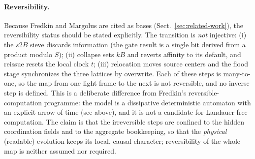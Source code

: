 \documentclass{ijuc}
\begin{document}
\paragraph{Reversibility.} Because Fredkin and Margolus are cited as bases (Sect.~\ref{sec:related-work}), the reversibility status should be stated explicitly.  The transition is \emph{not} injective: (i) the $s2B$ sieve discards information (the gate result is a single bit derived from a product modulo $S$); (ii) collapse sets $kB$ and reverts affinity to its default, and reissue resets the local clock $t$; (iii) relocation moves source centers and the flood stage synchronizes the three lattices by overwrite.  Each of these steps is many-to-one, so the map from one light frame to the next is not reversible, and no inverse step is defined.  This is a deliberate difference from Fredkin's reversible-computation programme: the model is a dissipative deterministic automaton with an explicit arrow of time (see above), and it is not a candidate for Landauer-free computation.  The claim is that the irreversible steps are confined to the hidden coordination fields and to the aggregate bookkeeping, so that the \emph{physical} (readable) evolution keeps its local, causal character; reversibility of the whole map is neither assumed nor required.
\end{document}

